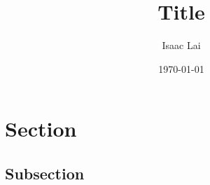 \documentclass[11pt]{article}
\title{Title}
\date{\today}
\author{Isaac Lai}
\theoremstyle{remark}
\begin{document}
\maketitle
\section{Section}
\subsection{Subsection}
\end{document}
